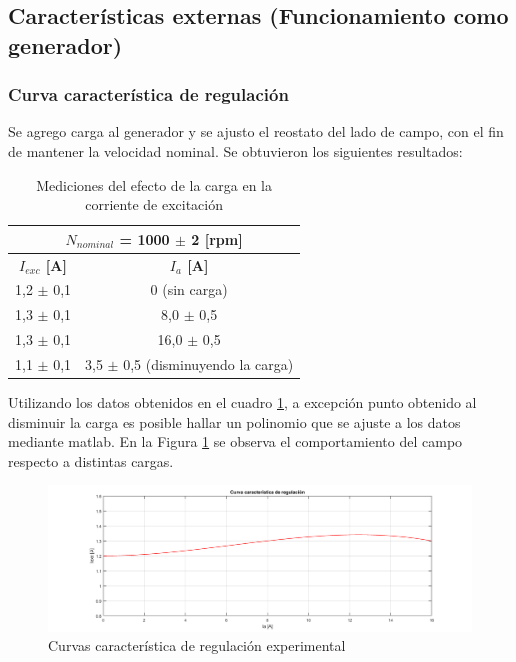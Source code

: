 \documentclass[11pt,letterpaper]{article}     %
\begin{document}
\subsection{Características externas (Funcionamiento como generador)}
\subsubsection{Curva característica de regulación}
Se agrego carga al generador y se ajusto el reostato del lado de campo, con el fin de mantener la velocidad nominal. Se obtuvieron los siguientes resultados:
\begin{table}[H]
	\centering
	\caption{Mediciones del efecto de la carga en la corriente de excitación}
	\label{MedCurvaCaractReg}
	\begin{tabular}{|c|c|}
		\hline
		\multicolumn{2}{|c|}{\textbf{$N_{nominal}$ = 1000 $\pm$ 2 {[}rpm{]}}} \\ \hline
		\textbf{$I_{exc}$ {[}A{]}}   & \textbf{$I_{a}$ {[}A{]}}               \\ \hline
		1,2 $\pm$ 0,1                & 0 (sin carga)                          \\ \hline
		1,3 $\pm$ 0,1                & 8,0 $\pm$ 0,5                          \\ \hline
		1,3 $\pm$ 0,1                & 16,0 $\pm$ 0,5                         \\ \hline
		1,1 $\pm$ 0,1                & 3,5 $\pm$ 0,5 (disminuyendo la carga)  \\ \hline
	\end{tabular}
\end{table}
Utilizando los datos obtenidos en el cuadro \ref{MedCurvaCaractReg}, a excepción punto obtenido al disminuir la carga es posible hallar un polinomio que se ajuste a los datos mediante matlab. En la Figura \ref{fig:curvaCaractReg} se observa el comportamiento del campo respecto a distintas cargas.
\begin{figure}[H]
	\centering
	\includegraphics[scale=0.5]{./recursos-Lab6/curvaCaractRegulacion.png}
	\caption{Curvas característica de regulación experimental}
	\label{fig:curvaCaractReg}
\end{figure}
\end{document}
